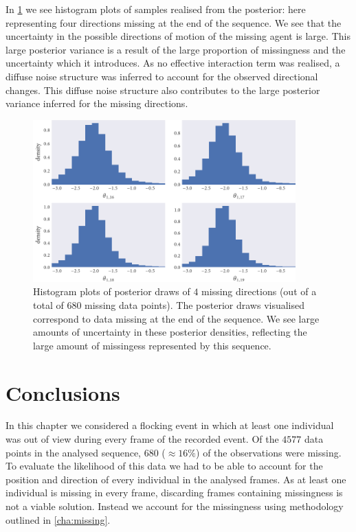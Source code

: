 In \cref{fig:dir_hist} we see histogram plots of samples realised from the
posterior: here representing four directions missing at the end of the
sequence. We see that the uncertainty in the possible directions of motion of
the missing agent is large. This large posterior variance is a result of the
large proportion of missingness and the uncertainty which it introduces. As no
effective interaction term was realised, a diffuse noise structure was inferred
to account for the observed directional changes. This diffuse noise structure
also contributes to the large posterior variance inferred for the missing
directions.

\begin{figure}[tb]
  \includegraphics[width=0.9\textwidth]{dir_hist.pdf}
  \caption{Histogram plots of posterior draws of $4$ missing directions (out of
    a total of $680$ missing data points). The posterior draws visualised
    correspond to data missing at the end of the sequence. We see large amounts
    of uncertainty in these posterior densities, reflecting the large amount of
    missingess represented by this sequence.}
  \label{fig:dir_hist}
\end{figure}

\section*{Conclusions}

In this chapter we considered a flocking event in which at least one individual
was out of view during every frame of the recorded event. Of the $4577$ data
points in the analysed sequence, $680$ ($\approx16\%$) of the observations were
missing. To evaluate the likelihood of this data we had to be able to account
for the position and direction of every individual in the analysed frames. As
at least one individual is missing in every frame, discarding frames containing
missingness is not a viable solution. Instead we account for the missingness
using methodology outlined in \cref{cha:missing}.

